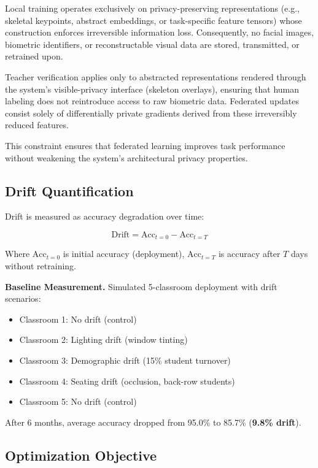 \documentclass[conference]{IEEEtran}
\begin{document}
Local training operates exclusively on privacy-preserving representations (e.g., skeletal keypoints, abstract embeddings, or task-specific feature tensors) whose construction enforces irreversible information loss. Consequently, no facial images, biometric identifiers, or reconstructable visual data are stored, transmitted, or retrained upon.

Teacher verification applies only to abstracted representations rendered through the system's visible-privacy interface (skeleton overlays), ensuring that human labeling does not reintroduce access to raw biometric data. Federated updates consist solely of differentially private gradients derived from these irreversibly reduced features.

This constraint ensures that federated learning improves task performance without weakening the system's architectural privacy properties.

\subsection{Drift Quantification}

Drift is measured as accuracy degradation over time:

\begin{equation}
\text{Drift} = \text{Acc}_{t=0} - \text{Acc}_{t=T}
\end{equation}

Where $\text{Acc}_{t=0}$ is initial accuracy (deployment), $\text{Acc}_{t=T}$ is accuracy after $T$ days without retraining.

\textbf{Baseline Measurement.} Simulated 5-classroom deployment with drift scenarios:
\begin{itemize}
    \item Classroom 1: No drift (control)
    \item Classroom 2: Lighting drift (window tinting)
    \item Classroom 3: Demographic drift (15\% student turnover)
    \item Classroom 4: Seating drift (occlusion, back-row students)
    \item Classroom 5: No drift (control)
\end{itemize}

After 6 months, average accuracy dropped from 95.0\% to 85.7\% (\textbf{9.8\% drift}).

\subsection{Optimization Objective}
\end{document}
